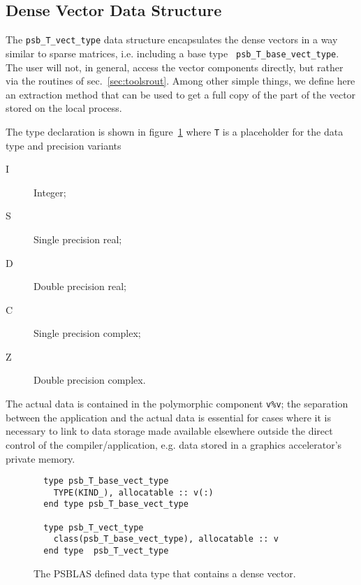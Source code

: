 \subsection{Dense Vector Data Structure}
\label{sec:vecttype}
The \hypertarget{vdata}{{\tt psb\_T\_vect\_type}} data structure
encapsulates the dense vectors in a way similar to sparse matrices,
i.e. including a base type \hypertarget{vbasedata}{{\tt
    psb\_T\_base\_vect\_type}}.  
The user will not, in general, access the vector components directly,
but rather via the routines of sec.~\ref{sec:toolsrout}. Among other
simple things, we define here an extraction method that can be used to
get a full copy of the part of the vector stored on the local
process. 

 The type declaration is shown in
figure~\ref{fig:vectype} where \verb|T| is a placeholder for the
data type and precision variants 
\begin{description}
\item[I] Integer;
\item[S] Single precision real;
\item[D] Double precision real;
\item[C] Single precision complex;
\item[Z] Double precision complex.
\end{description}
The actual data is contained in the polymorphic component \verb|v%v|; 
the separation between the application and the actual data is
essential for cases where it is necessary to link to data storage made
available elsewhere outside the direct control of the
compiler/application, e.g. data stored in a graphics  accelerator's
private memory. 
\begin{figure}[h!]
\begin{center}
    \begin{minipage}[tl]{0.85\textwidth}
\begin{verbatim}
  type psb_T_base_vect_type
    TYPE(KIND_), allocatable :: v(:)
  end type psb_T_base_vect_type

  type psb_T_vect_type
    class(psb_T_base_vect_type), allocatable :: v 
  end type  psb_T_vect_type

\end{verbatim}
    \end{minipage}
  \end{center}
  \caption{\label{fig:vectype} 
    The PSBLAS defined data type that
    contains a dense vector.} 
\end{figure}


